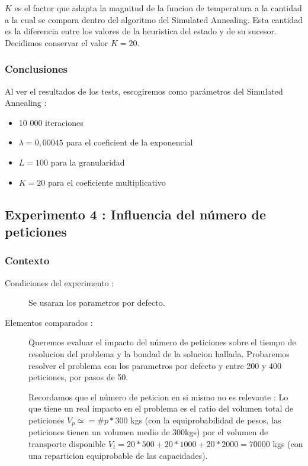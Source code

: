 \documentclass{article}
\begin{document}
$K$ es el factor que adapta la magnitud de la funcion de temperatura a la
cantidad a la cual se compara dentro del algoritmo del Simulated Annealing. Esta
cantidad es la diferencia entre los valores de la heuristica del estado y de su
sucesor. Decidimos conservar el valor $K=20$.

\subsubsection{Conclusiones}

Al ver el resultados de los tests, escogiremos como parámetros del Simulated
Annealing :
\begin{itemize}
\item 10 000 iteraciones
\item $\lambda = 0,00045$ para el coeficient de la exponencial
\item $L=100$ para la granularidad
\item $K=20$ para el coeficiente multiplicativo
\end{itemize}

\subsection{Experimento 4 : Influencia del número de peticiones}

\subsubsection{Contexto}
\begin{description}
\item[Condiciones del experimento :] Se usaran los parametros por defecto.
\item[Elementos comparados :] Queremos evaluar el impacto del número de
peticiones sobre el tiempo de resolucion del problema y la bondad de la solucion
hallada. Probaremos resolver el problema con los parametros por defecto y entre
200 y 400 peticiones, por pasos de 50.

Recordamos que el número de peticion en si mismo no es relevante : Lo que tiene
un real impacto en el problema es el ratio del volumen total de peticiones
$V_p\simeq = \#p * 300$ kgs (con la equiprobabilidad de pesos, las peticiones
tienen un volumen medio de 300kgs) por el volumen de transporte disponible
$V_t = 20*500+20*1000+20*2000 = 70 000$ kgs (con una reparticion equiprobable de
las capacidades).
\end{description}
\end{document}
